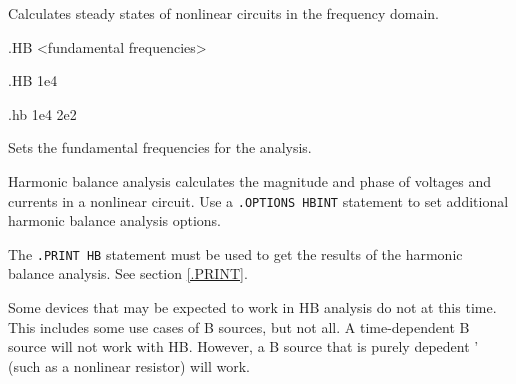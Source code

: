 


 
Calculates steady states of nonlinear circuits in the frequency domain.

\begin{Command}

\format
.HB <fundamental frequencies>

\examples
.HB 1e4

.hb 1e4 2e2
\arguments

\begin{Arguments}
Sets the fundamental frequencies for the analysis.

\end{Arguments}

\comments

Harmonic balance analysis calculates the magnitude and phase of voltages
and currents in a nonlinear circuit. Use a \texttt{.OPTIONS HBINT}
statement to set additional harmonic balance analysis options.

The \texttt{.PRINT HB}
statement must be used to get the results of the harmonic balance analysis. 
See section \ref{.PRINT}.

Some devices that may be expected to work in HB analysis do not at this time.  
  This includes some use cases of B sources, but not all.  A time-dependent B 
  source will not work with HB.  However, a B source that is purely depedent '
  (such as a nonlinear resistor) will work.  

\end{Command}
